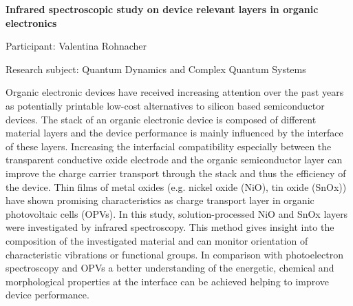 \begin{minipage}[t]{1.0\textwidth}

\begin{center}

{{\large\bfseries Infrared spectroscopic study on device relevant layers in organic electronics}\par}

\end{center}

{\noindent Participant: Valentina Rohnacher\par} 

{\noindent Research subject: Quantum Dynamics and Complex Quantum Systems\par}\medskip

\noindent Organic electronic devices have received increasing attention over the past years as potentially printable low-cost alternatives to silicon based semiconductor devices. The stack of an organic electronic device is composed of different material layers and the device performance is mainly influenced by the interface of these layers. Increasing the interfacial compatibility especially between the transparent conductive oxide electrode and the organic semiconductor layer can improve the charge carrier transport through the stack and thus the efficiency of the device.
Thin films of metal oxides (e.g. nickel oxide (NiO), tin oxide (SnOx)) have shown promising characteristics as charge transport layer in organic photovoltaic cells (OPVs). In this study, solution-processed NiO and SnOx layers were investigated by infrared spectroscopy. This method gives insight into the composition of the investigated material and can monitor orientation of characteristic vibrations or functional groups. In comparison with photoelectron spectroscopy and OPVs a better understanding of the energetic, chemical and morphological properties at the interface can be achieved helping to improve device performance.\par\end{minipage}

\hfill 

